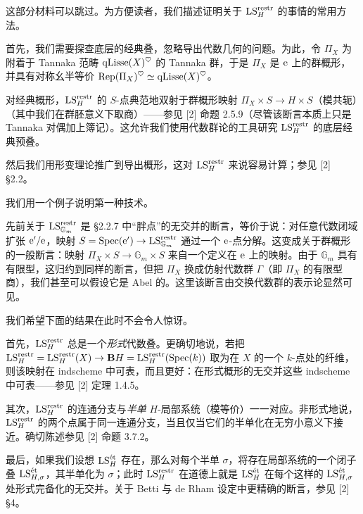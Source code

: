  这部分材料可以跳过。为方便读者，我们描述证明关于 $\LS^{\restr}_{H}$ 的事情的常用方法。

首先，我们需要探查底层的经典叠，忽略导出代数几何的问题。为此，令 $\Pi_X$ 为附着于 Tannaka 范畴 $\qLisse(X)^{\heartsuit}$ 的 Tannaka 群，于是 $\Pi_X$ 是 $\e$ 上的群概形，并具有对称幺半等价 $\Rep(\Pi_X)^{\heartsuit} \simeq \qLisse(X)^{\heartsuit}$。

对经典概形，$\LS^{\restr}_{H}$ 的 $S$-点典范地双射于群概形映射 $\Pi_X \times S \to H \times S$（模共轭）（其中我们在群胚意义下取商）——参见 [2] 命题 2.5.9（尽管该断言本质上只是 Tannaka 对偶加上簿记）。这允许我们使用代数群论的工具研究 $\LS^{\restr}_{H}$ 的底层经典预叠。

然后我们用形变理论推广到导出概形，这对 $\LS^{\restr}_{H}$ 来说容易计算；参见 [2] §2.2。

\begin{example}
我们用一个例子说明第一种技术。

先前关于 $\LS^{\restr}_{\mathbb{G}_m}$ 是 §2.2.7 中“胖点”的无交并的断言，等价于说：对任意代数闭域扩张 $\e'/\e$，映射 $S = \Spec(\e') \to \LS^{\restr}_{\mathbb{G}_m}$ 通过一个 $\e$-点分解。这变成关于群概形的一般断言：映射 $\Pi_X \times S \to \mathbb{G}_m \times S$ 来自一个定义在 $\e$ 上的映射。由于 $\mathbb{G}_m$ 具有有限型，这归约到同样的断言，但把 $\Pi_X$ 换成仿射代数群 $\Gamma$（即 $\Pi_X$ 的有限型商），我们甚至可以假设它是 Abel 的。这里该断言由交换代数群的表示论显然可见。
\end{example}

 我们希望下面的结果在此时不会令人惊讶。

首先，$\LS^{\restr}_{H}$ 总是一个\emph{形式}代数叠。更确切地说，若把 $\LS^{\restr}_{H} = \LS^{\restr}_{H}(X) \to \mathbf{B}H = \LS^{\restr}_{H}(\Spec(k))$ 取为在 $X$ 的一个 $k$-点处的纤维，则该映射在 indscheme 中可表，而且更好：在形式概形的无交并这些 indscheme 中可表——参见 [2] 定理 1.4.5。

其次，$\LS^{\restr}_{H}$ 的连通分支与\emph{半单} $H$-局部系统（模等价）一一对应。非形式地说，$\LS^{\restr}_{H}$ 的两个点属于同一连通分支，当且仅当它们的半单化在无穷小意义下接近。确切陈述参见 [2] 命题 3.7.2。

最后，如果我们设想 $\LS^{\et}_{H}$ 存在，那么对每个半单 $\sigma$，将存在局部系统的一个闭子叠 $\LS^{\et}_{H,\sigma}$，其半单化为 $\sigma$；此时 $\LS^{\restr}_{H}$ 在道德上就是 $\LS^{\et}_{H}$ 在每个这样的 $\LS^{\et}_{H,\sigma}$ 处形式完备化的无交并。关于 Betti 与 de Rham 设定中更精确的断言，参见 [2] §4。
